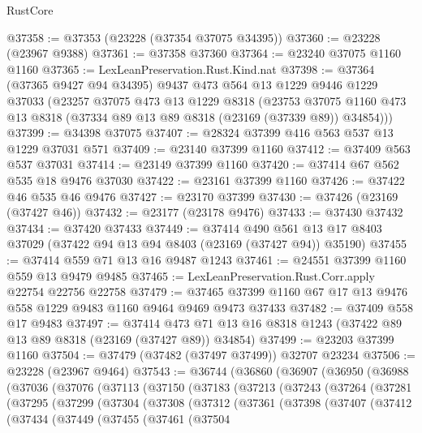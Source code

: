 \begin{lexlean}{RustCore}
\begin{coremodule}
@37358 := @37353 (@23228 (@37354 @37075 @34395))
@37360 := @23228 (@23967 @9388)
@37361 := @37358 @37360
@37364 := @23240 @37075 @1160 @1160
@37365 := LexLeanPreservation.Rust.Kind.nat
@37398 := @37364
    (@37365 @9427 @94 @34395)
    @9437
    @473
    @564
    @13
    @1229
    @9446
    @1229
    @37033
    (@23257
      @37075
      @473
      @13
      @1229
      @8318
      (@23753 @37075 @1160 @473 @13 @8318 (@37334 @89 @13 @89 @8318 (@23169 (@37339 @89)) @34854)))
@37399 := @34398 @37075
@37407 := @28324 @37399 @416 @563 @537 @13 @1229 @37031 @571
@37409 := @23140 @37399 @1160
@37412 := @37409 @563 @537 @37031
@37414 := @23149 @37399 @1160
@37420 := @37414 @67 @562 @535 @18 @9476 @37030
@37422 := @23161 @37399 @1160
@37426 := @37422 @46 @535 @46 @9476
@37427 := @23170 @37399
@37430 := @37426 (@23169 (@37427 @46))
@37432 := @23177 (@23178 @9476)
@37433 := @37430 @37432
@37434 := @37420 @37433
@37449 := @37414
    @490
    @561
    @13
    @17
    @8403
    @37029
    (@37422 @94 @13 @94 @8403 (@23169 (@37427 @94)) @35190)
@37455 := @37414 @559 @71 @13 @16 @9487 @1243
@37461 := @24551 @37399 @1160 @559 @13 @9479 @9485
@37465 := LexLeanPreservation.Rust.Corr.apply @22754 @22756 @22758
@37479 := @37465 @37399 @1160 @67 @17 @13 @9476 @558 @1229 @9483 @1160 @9464 @9469 @9473 @37433
@37482 := @37409 @558 @17 @9483
@37497 := @37414
    @473
    @71
    @13
    @16
    @8318
    @1243
    (@37422 @89 @13 @89 @8318 (@23169 (@37427 @89)) @34854)
@37499 := @23203 @37399 @1160
@37504 := @37479 (@37482 (@37497 @37499)) @32707 @23234
@37506 := @23228 (@23967 @9464)
@37543 := @36744
    (@36860
      (@36907
        (@36950
          (@36988
            (@37036
              (@37076
                (@37113
                  (@37150
                    (@37183
                      (@37213
                        (@37243
                          (@37264
                            (@37281
                              (@37295
                                (@37299
                                  (@37304
                                    (@37308
                                      (@37312
                                        (@37361
                                          (@37398
                                            (@37407
                                              (@37412
                                                (@37434
                                                  (@37449
                                                    (@37455
                                                      (@37461
                                                        (@37504

\end{coremodule}
\end{lexlean}
